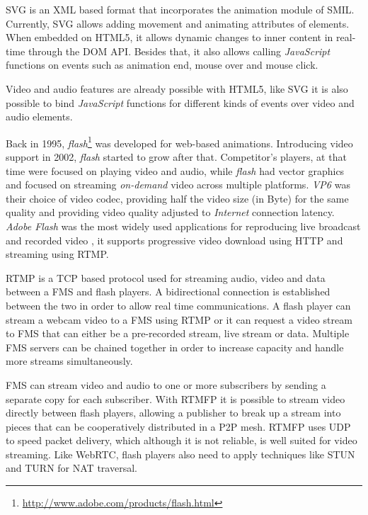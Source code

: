   
  \ac{SVG} is an \ac{XML} based format that incorporates the animation module of \ac{SMIL}. Currently, \ac{SVG} allows adding movement and animating attributes of elements. When embedded on \ac{HTML}5, it allows dynamic changes to inner content in real-time through the \ac{DOM} \ac{API}. Besides that, it also allows calling \emph{JavaScript} functions on events such as animation end, mouse over and mouse click.

  Video and audio features are already possible with \ac{HTML}5, like \ac{SVG} it is also possible to bind \emph{JavaScript} functions for different kinds of events over video and audio elements.
  
  Back in 1995, \emph{flash}\footnote{\url{http://www.adobe.com/products/flash.html}} was developed for web-based animations. Introducing video support in 2002, \emph{flash} started to grow after that. Competitor's players, at that time were focused on playing video and audio, while \emph{flash} had vector graphics and focused on streaming \emph{on-demand} video across multiple platforms. \emph{VP6} was their choice of video codec, providing half the video size (in Byte) for the same quality and providing video quality adjusted to \emph{Internet} connection latency. 
  \emph{Adobe Flash} was the most widely used applications for reproducing live broadcast and recorded video \cite{flashvideo}, it supports progressive video download using \ac{HTTP} and streaming using \ac{RTMP}.

  \ac{RTMP} is a \ac{TCP} based protocol used for streaming audio, video and data between a \ac{FMS} and flash players. A bidirectional connection is established between the two in order to allow real time communications. A flash player can stream a webcam video to a \ac{FMS} using \ac{RTMP} or it can request a video stream to \ac{FMS} that can either be a pre-recorded stream, live stream or data. Multiple \ac{FMS} servers can be chained together in order to increase capacity and handle more streams simultaneously.

  \ac{FMS} can stream video and audio to one or more subscribers by sending a separate copy for each subscriber. With \ac{RTMFP} it is possible to stream video directly between flash players, allowing a publisher to break up a stream into pieces that can be cooperatively distributed in a P2P mesh. \ac{RTMFP} uses \ac{UDP} to speed packet delivery, which although it is not reliable, is well suited for video streaming. Like \ac{WebRTC}, flash players also need to apply techniques like \ac{STUN} and \ac{TURN} for \ac{NAT} traversal.

